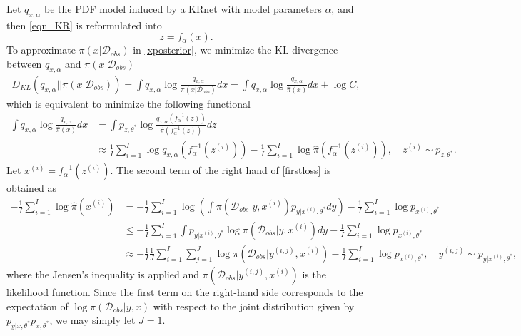 Let $q_{x,\alpha}$ be the PDF model induced by a KRnet with model parameters $\alpha$, and then  \eqref{eqn_KR} is reformulated into
\begin{equation}\label{eqn_KR_alpha}
    {z} = f_{\alpha}({x}).
\end{equation}
To approximate $\pi(x|\mathcal{D}_{obs})$ in  \eqref{xposterior}, we minimize the KL divergence between $q_{x,\alpha}$ and $\pi(x|\mathcal{D}_{obs})$
\begin{align*}
	D_{KL}\left(q_{x,\alpha}||\pi\left(x|\mathcal{D}_{obs}\right)\right)=\int q_{x,\alpha}\log \frac{q_{x,\alpha}}{\pi(x|\mathcal{D}_{obs})} dx
	=\int q_{x,\alpha}\log \frac{q_{x,\alpha}}{\hat{\pi}(x)} dx+\log C,
\end{align*}
which is equivalent to minimize the following functional
\begin{align}
	\int q_{x,\alpha}\log \frac{q_{x,\alpha}}{\hat{\pi}(x)} dx 
	&=\int p_{z,\theta^*}\log \frac{q_{x,\alpha}\left(f_{\alpha}^{-1}(z)\right)}{\hat{\pi}\left(f_{\alpha}^{-1}(z)\right)} dz \nonumber\\
	&\approx\frac{1}{I}\sum_{i=1}^I\log q_{x,\alpha}\left(f_{\alpha}^{-1}\left(z^{(i)}\right)\right)-\frac{1}{I}\sum_{i=1}^I\log \hat{\pi}\left(f_{\alpha}^{-1}\left(z^{(i)}\right)\right),\quad z^{(i)} \sim p_{z,\theta^*}. \label{firstloss}
\end{align}
Let $x^{(i)}=f_{\alpha}^{-1}\left(z^{(i)}\right)$. The second term of the right hand of  \eqref{firstloss} is obtained as
\begin{align*}
	-\frac{1}{I}\sum_{i=1}^I\log \hat{\pi}\left(x^{(i)}\right)
	&=-\frac{1}{I}\sum_{i=1}^I\log \left(\int \pi\left(\mathcal{D}_{obs}|y,x^{(i)}\right) p_{y|x^{(i)},\theta^*} dy\right) -\frac{1}{I}\sum_{i=1}^I\log p_{x^{(i)},\theta^*}\\
	&\leq -\frac{1}{I}\sum_{i=1}^I\int p_{y|x^{(i)},\theta^*} \log \pi\left(\mathcal{D}_{obs}|y,x^{(i)}\right) dy-\frac{1}{I}\sum_{i=1}^I\log p_{x^{(i)},\theta^*}\\
	&\approx -\frac{1}{I}\frac{1}{J}\sum_{i=1}^I\sum_{j=1}^J \log \pi\left(\mathcal{D}_{obs}|y^{(i,j)},x^{(i)}\right)-\frac{1}{I}\sum_{i=1}^I\log p_{x^{(i)},\theta^*},\quad y^{(i,j)}\sim p_{y|x^{(i)},\theta^*}, 
\end{align*}
where the Jensen's inequality is applied and $\pi\left(\mathcal{D}_{obs}|y^{(i,j)},x^{(i)}\right)$ is the likelihood function. Since the first term on the right-hand side corresponds to the expectation of $\log\pi(\mathcal{D}_{obs}|y,x)$ with respect to the joint distribution given by $p_{y|x,\theta^*}p_{x,\theta^*}$, we may simply let $J=1$.  
